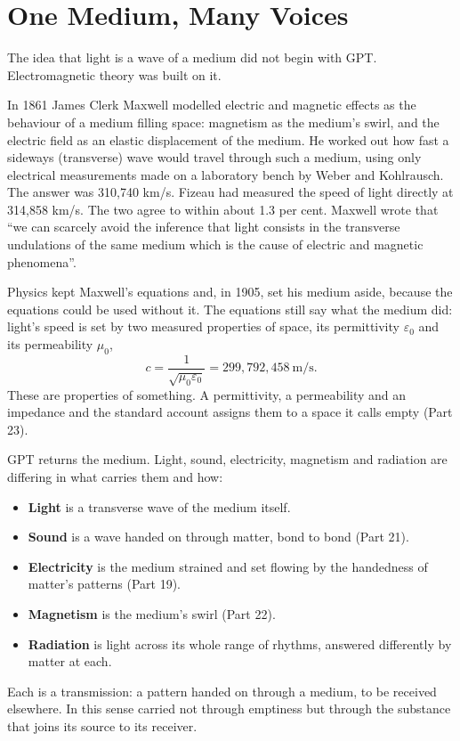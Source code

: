 \section{One Medium, Many Voices}

The idea that light is a wave of a medium did not begin with GPT. Electromagnetic theory was built on it.

In 1861 James Clerk Maxwell modelled electric and magnetic effects as the behaviour of a medium filling space: magnetism as the medium's swirl, and the electric field as an elastic displacement of the medium. He worked out how fast a sideways (transverse) wave would travel through such a medium, using only electrical measurements made on a laboratory bench by Weber and Kohlrausch. The answer was 310,740 km/s. Fizeau had measured the speed of light directly at 314,858 km/s. The two agree to within about 1.3 per cent. Maxwell wrote that ``we can scarcely avoid the inference that light consists in the transverse undulations of the same medium which is the cause of electric and magnetic phenomena''.

Physics kept Maxwell's equations and, in 1905, set his medium aside, because the equations could be used without it. The equations still say what the medium did: light's speed is set by two measured properties of space, its permittivity $\varepsilon_0$ and its permeability $\mu_0$,
\begin{equation}
c = \frac{1}{\sqrt{\mu_0\varepsilon_0}} = 299{,}792{,}458~\text{m/s}.
\end{equation}
These are properties of something. A permittivity, a permeability and an impedance  and the standard account assigns them to a space it calls empty (Part 23).

GPT returns the medium. Light, sound, electricity, magnetism and radiation are  differing in what carries them and how:
\begin{itemize}
\item \textbf{Light} is a transverse wave of the medium itself.
\item \textbf{Sound} is a wave handed on through matter, bond to bond (Part 21).
\item \textbf{Electricity} is the medium strained and set flowing by the handedness of matter's patterns (Part 19).
\item \textbf{Magnetism} is the medium's swirl (Part 22).
\item \textbf{Radiation} is light across its whole range of rhythms, answered differently by matter at each.
\end{itemize}
Each is a transmission: a pattern handed on through a medium, to be received elsewhere. In this sense  carried not through emptiness but through the substance that joins its source to its receiver.

